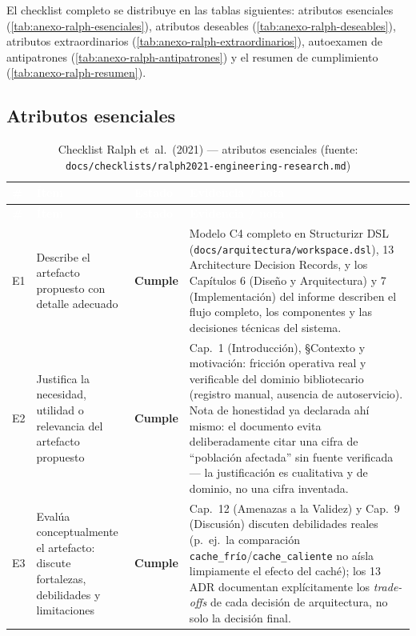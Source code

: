 El checklist completo se distribuye en las tablas siguientes:
atributos esenciales (\autoref{tab:anexo-ralph-esenciales}), atributos
deseables (\autoref{tab:anexo-ralph-deseables}), atributos
extraordinarios (\autoref{tab:anexo-ralph-extraordinarios}),
autoexamen de antipatrones (\autoref{tab:anexo-ralph-antipatrones}) y
el resumen de cumplimiento (\autoref{tab:anexo-ralph-resumen}).

\subsection{Atributos esenciales}

\begin{center}
\scriptsize
\renewcommand{\arraystretch}{1.15}
\begin{longtable}{|p{0.7cm}|p{4.2cm}|p{1.6cm}|p{7.0cm}|}
\caption{Checklist Ralph et~al.\ (2021) --- atributos esenciales
  (fuente: \texttt{docs/checklists/ralph2021-engineering-research.md})}
\label{tab:anexo-ralph-esenciales}\\
\hline
\rowcolor{verdeuteq}
\textcolor{white}{\textbf{\#}} &
\textcolor{white}{\textbf{Ítem}} &
\textcolor{white}{\textbf{Estado}} &
\textcolor{white}{\textbf{Evidencia / nota}} \\
\hline
\endfirsthead
\hline
\rowcolor{verdeuteq}
\textcolor{white}{\textbf{\#}} &
\textcolor{white}{\textbf{Ítem}} &
\textcolor{white}{\textbf{Estado}} &
\textcolor{white}{\textbf{Evidencia / nota}} \\
\hline
\endhead
\hline
\endfoot
E1 & Describe el artefacto propuesto con detalle adecuado & \textbf{Cumple} & Modelo C4 completo en Structurizr DSL (\texttt{docs/arquitectura/workspace.dsl}), 13 Architecture Decision Records, y los Capítulos 6 (Diseño y Arquitectura) y 7 (Implementación) del informe describen el flujo completo, los componentes y las decisiones técnicas del sistema. \\
\hline
E2 & Justifica la necesidad, utilidad o relevancia del artefacto propuesto & \textbf{Cumple} & Cap.\ 1 (Introducción), §Contexto y motivación: fricción operativa real y verificable del dominio bibliotecario (registro manual, ausencia de autoservicio). Nota de honestidad ya declarada ahí mismo: el documento evita deliberadamente citar una cifra de ``población afectada'' sin fuente verificada --- la justificación es cualitativa y de dominio, no una cifra inventada. \\
\hline
E3 & Evalúa conceptualmente el artefacto: discute fortalezas, debilidades y limitaciones & \textbf{Cumple} & Cap.\ 12 (Amenazas a la Validez) y Cap.\ 9 (Discusión) discuten debilidades reales (p.\ ej.\ la comparación \texttt{cache\_frío}/\texttt{cache\_caliente} no aísla limpiamente el efecto del caché); los 13 ADR documentan explícitamente los \emph{trade-offs} de cada decisión de arquitectura, no solo la decisión final. \\

\end{longtable}
\end{center}
